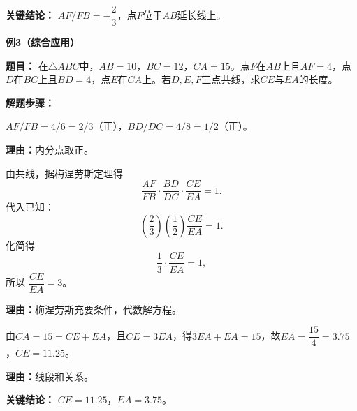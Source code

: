 \begin{examplebox}
	\textbf{\textcolor{CExample}{关键结论：}}
	$AF/FB=-\dfrac{2}{3}$，点$F$位于$AB$延长线上。

	\medskip
	\textbf{\textcolor{CExample}{例3（综合应用）}}

	\textbf{\textcolor{CExample}{题目：}}
	在$\triangle ABC$中，$AB=10$，$BC=12$，$CA=15$。点$F$在$AB$上且$AF=4$，点$D$在$BC$上且$BD=4$，点$E$在$CA$上。若$D,E,F$三点共线，求$CE$与$EA$的长度。

	\textbf{\textcolor{CExample}{解题步骤：}}
	\begin{description}[style=nextline, leftmargin=2.8em, labelsep=0.5em, itemsep=0.45em]
		\item[\textbf{第一步（计算有向比）：}] $AF/FB=4/6=2/3$（正），$BD/DC=4/8=1/2$（正）。
			\par\textbf{理由：}内分点取正。
		\item[\textbf{第二步（应用梅涅劳斯得比例）：}] 由共线，据梅涅劳斯定理得
			\[
				\frac{AF}{FB}\cdot\frac{BD}{DC}\cdot\frac{CE}{EA}=1.
			\]
			代入已知：
			\[
				\left(\frac{2}{3}\right)\left(\frac{1}{2}\right)\frac{CE}{EA}=1.
			\]
			化简得
			\[
				\frac{1}{3}\cdot\frac{CE}{EA}=1,
			\]
			所以 $\dfrac{CE}{EA}=3$。
			\par\textbf{理由：}梅涅劳斯充要条件，代数解方程。
		\item[\textbf{第三步（求具体长度）：}] 由$CA=15=CE+EA$，且$CE=3EA$，得$3EA+EA=15$，故$EA=\dfrac{15}{4}=3.75$，$CE=11.25$。
			\par\textbf{理由：}线段和关系。
	\end{description}

	\textbf{\textcolor{CExample}{关键结论：}}
	$CE=11.25$，$EA=3.75$。
\end{examplebox}
